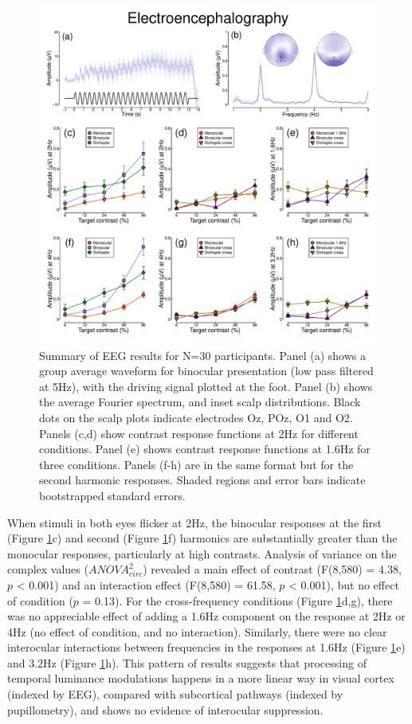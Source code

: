 \documentclass[
]{article}
\begin{document}
\begin{figure}

{\centering \includegraphics{Figures/EEGdata} 

}

\caption{Summary of EEG results for N=30 participants. Panel (a) shows a group average waveform for binocular presentation (low pass filtered at 5Hz), with the driving signal plotted at the foot. Panel (b) shows the average Fourier spectrum, and inset scalp distributions. Black dots on the scalp plots indicate electrodes Oz, POz, O1 and O2. Panels (c,d) show contrast response functions at 2Hz for different conditions. Panel (e) shows contrast response functions at 1.6Hz for three conditions. Panels (f-h) are in the same format but for the second harmonic responses. Shaded regions and error bars indicate bootstrapped standard errors.}\label{fig:EEGdata}
\end{figure}

When stimuli in both eyes flicker at 2Hz, the binocular responses at the first (Figure \ref{fig:EEGdata}c) and second (Figure \ref{fig:EEGdata}f) harmonics are substantially greater than the monocular responses, particularly at high contrasts. Analysis of variance on the complex values (\(ANOVA^2_{circ}\)) revealed a main effect of contrast (F(8,580) = 4.38, \(p\) \textless{} 0.001) and an interaction effect (F(8,580) = 61.58, \(p\) \textless{} 0.001), but no effect of condition (\(p\) = 0.13). For the cross-frequency conditions (Figure \ref{fig:EEGdata}d,g), there was no appreciable effect of adding a 1.6Hz component on the response at 2Hz or 4Hz (no effect of condition, and no interaction). Similarly, there were no clear interocular interactions between frequencies in the responses at 1.6Hz (Figure \ref{fig:EEGdata}e) and 3.2Hz (Figure \ref{fig:EEGdata}h). This pattern of results suggests that processing of temporal luminance modulations happens in a more linear way in visual cortex (indexed by EEG), compared with subcortical pathways (indexed by pupillometry), and shows no evidence of interocular suppression.
\end{document}
